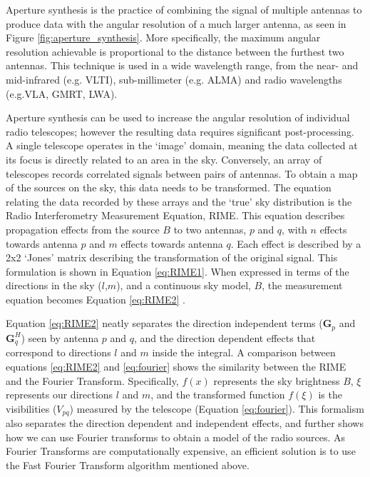 Aperture synthesis is the practice of combining the signal of multiple antennas to produce data with the angular resolution of a much larger antenna, as seen in Figure \ref{fig:aperture_synthesis}. More specifically, the maximum angular resolution achievable is proportional to the distance between the furthest two antennas. This technique is used in a wide wavelength range, from the near- and mid-infrared (e.g. VLTI), sub-millimeter (e.g. ALMA) and radio wavelengths (e.g.VLA, GMRT, LWA). 

Aperture synthesis can be used to increase the angular resolution of individual radio telescopes; however the resulting data requires significant post-processing. A single telescope operates in the `image' domain, meaning the data collected at its focus is directly related to an area in the sky. Conversely, an array of telescopes records correlated signals between pairs of antennas. To obtain a map of the sources on the sky, this data needs to be transformed. The equation relating the data recorded by these arrays and the `true' sky distribution is the Radio Interferometry Measurement Equation, RIME. This equation describes propagation effects from the source $B$ to two antennas, $p$ and $q$, with $n$ effects towards antenna $p$ and $m$ effects towards antenna $q$. Each effect is described by a 2x2 `Jones' matrix describing the transformation of the original signal. This formulation is shown in Equation \ref{eq:RIME1}. When expressed in terms of the directions in the sky ($l$,$m$), and a continuous sky model, $B$, the measurement equation becomes Equation \ref{eq:RIME2}\citep{thompson1986interferometry} .

Equation \ref{eq:RIME2} neatly separates the direction independent terms ($\bm{G}_p$ and $\bm{G}^H_q$) seen by antenna $p$ and $q$, and the direction dependent effects that correspond to directions $l$ and $m$ inside the integral. A comparison between equations \ref{eq:RIME2} and \ref{eq:fourier} shows the similarity between the RIME and the Fourier Transform. Specifically, $f(x)$ represents the sky brightness $B$, $\xi$ represents our directions $l$ and $m$, and the transformed function $f(\xi)$ is the visibilities ($V_{pq}$) measured by the telescope (Equation \ref{eq:fourier}). This formalism  also separates the direction dependent and independent effects, and further shows how we can use Fourier transforms to obtain a model of the radio sources. As Fourier Transforms are computationally expensive, an efficient solution is to use the Fast Fourier Transform algorithm mentioned above. 

